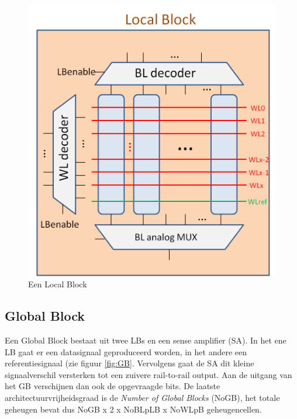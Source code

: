 \begin{figure}
  \centering
  \includegraphics[scale=0.3]{../fig/hfdstk-architecture-localblock.png}
  \caption{Een Local Block}
  \label{fig:LB}
\end{figure}

\subsection{Global Block}
\label{globalblock}
Een Global Block bestaat uit twee LBs en een sense amplifier (SA). In het ene LB gaat er een datasignaal geproduceerd worden, in het andere een referentiesignaal (zie figuur \ref{fig:GB}. Vervolgens gaat de SA dit kleine signaalverschil versterken tot een zuivere rail-to-rail output.
Aan de uitgang van het GB verschijnen dan ook de opgevraagde bits.
De laatste architectuurvrijheidsgraad is de \emph{Number of Global Blocks} (NoGB), het totale geheugen bevat dus NoGB x 2 x NoBLpLB x NoWLpB geheugencellen.

